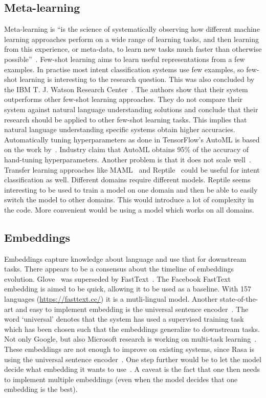 \subsection{Meta-learning}
\label{subsec:meta-learning}
Meta-learning is ``is the science of systematically observing how different machine learning approaches perform on a wide range of learning tasks, and then learning from this experience, or meta-data, to learn new tasks much faster than otherwise possible''~\citet{vanschoren2018meta}.
Few-shot learning aims to learn useful representations from a few examples.
In practise most intent classification systems use few examples, so few-shot learning is interesting to the research question.
This was also concluded by the IBM T. J. Watson Research Center~\citep{yu2018diverse}.
The authors show that their system outperforms other few-shot learning approaches.
They do not compare their system against natural language understanding solutions and conclude that their research should be applied to other few-shot learning tasks.
This implies that natural language understanding specific systems obtain higher accuracies.
Automatically tuning hyperparameters as done in TensorFlow's AutoML is based on the work by~\citet{andrychowicz2016learning}.
Industry claim that AutoML obtains 95\% of the accuracy of hand-tuning hyperparameters.
Another problem is that it does not scale well~\citep{jones2017}.
Transfer learning approaches like MAML~\citep{finn2017model} and Reptile~\citep{nichol2018reptile} could be useful for intent classification as well.
Different domains require different models.
Reptile seems interesting to be used to train a model on one domain and then be able to easily switch the model to other domains.
This would introduce a lot of complexity in the code.
More convenient would be using a model which works on all domains.

\subsection{Embeddings}
\label{subsec:embeddings}
Embeddings capture knowledge about language and use that for downstream tasks.
There appears to be a consensus about the timeline of embeddings evolution.
Glove~\citep{pennington2014} was superseded by FastText~\citep{joulin2016bag}.
The Facebook FastText embedding is aimed to be quick, allowing it to be used as a baseline.
With 157 languages (\url{https://fasttext.cc/}) it is a mutli-lingual model.
Another state-of-the-art and easy to implement embedding is the universal sentence encoder~\citep{cer2018universal}.
The word `universal' denotes that the system has used a supervised training task which has been chosen such that the embeddings generalize to downstream tasks.
Not only Google, but also Microsoft research is working on multi-task learning~\citep{subramanian2018learning}.
These embeddings are not enough to improve on existing systems, since Rasa is using the universal sentence encoder~\citep{wiese2018}.
One step further would be to let the model decide what embedding it wants to use~\citep{kiela2018dynamic}.
A caveat is the fact that one then needs to implement multiple embeddings (even when the model decides that one embedding is the best).
